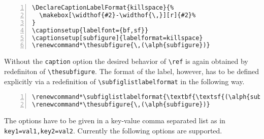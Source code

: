 \documentclass[version=3.12,american]{scrartcl}
\renewcommand*\thesubfigure{\,(\alph{subfigure})}
\begin{document}
\begin{Verbatim}[numbers=left]
\DeclareCaptionLabelFormat{killspace}{%
  \makebox[\widthof{#2}-\widthof{\,}][r]{#2}%
}
\captionsetup{labelfont={bf,sf}}
\captionsetup[subfigure]{labelformat=killspace}
\renewcommand*\thesubfigure{\,(\alph{subfigure})}
\end{Verbatim}

Without the \texttt{caption} option the desired behavior of \verb|\ref| is again obtained by redefiniton of \verb|\thesubfigure|. The format of the label, however, has to be defined explicitly via a redefinition of \verb|\subfiglistlabelformat| in the following way.

\begin{Verbatim}[numbers=left]
\renewcommand*\subfiglistlabelformat{\textbf{\textsf{(\alph{subfigure})}}}
\renewcommand*\thesubfigure{\,(\alph{subfigure})}
\end{Verbatim}

The options have to be given in a key-value comma separated list as in \texttt{key1=val1,key2=val2}. Currently the following options are supported.
\end{document}
